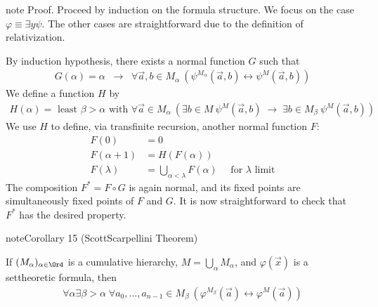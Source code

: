 \documentclass[letterpaper,10pt,english]{jupyterBook}
\begin{document}
\begin{sphinxadmonition}{note}
\sphinxAtStartPar
Proof. Proceed by induction on the formula structure. We focus on the case \(\varphi \equiv \exists y \psi\). The other cases are straightforward due to the definition of relativization.

\sphinxAtStartPar
By induction hypothesis, there exists a normal function \(G\) such that
\begin{equation*}
\begin{split}
G(\alpha) = \alpha \; \; \rightarrow \;\;  \forall \vec{a},b \in M_\alpha \: (\psi^{M_\alpha}(\vec{a},b) \leftrightarrow \psi^{M}(\vec{a},b))
\end{split}
\end{equation*}
\sphinxAtStartPar
We define a function \(H\) by
\begin{equation*}
\begin{split}
H(\alpha) = \text{ least } \beta > \alpha \text{ with } \forall \vec{a} \in M_\alpha \: ( \exists b \in M \: \psi^M(\vec{a},b) \; \rightarrow \; \exists b \in M_\beta \: \psi^M(\vec{a},b))
\end{split}
\end{equation*}
\sphinxAtStartPar
We use \(H\) to define, via transfinite recursion, another normal function \(F\):
\begin{align*}
	F(0) & = 0 \\
	F(\alpha+1) & = H(F(\alpha)) \\
	F(\lambda) & = \bigcup_{\alpha < \lambda} F(\alpha) \quad \text{ for $\lambda$ limit}
\end{align*}
\sphinxAtStartPar
The composition \(F^* = F\circ G\) is again normal, and its fixed points are simultaneously fixed points of \(F\) and \(G\). It is now straightforward to check  that \(F^*\) has the desired property.
\end{sphinxadmonition}
\label{constructible:cor-Scott-Scarpellini}
\begin{sphinxadmonition}{note}{Corollary 15 (Scott\sphinxhyphen{}Scarpellini Theorem)}



\sphinxAtStartPar
If \((M_\alpha)_{\alpha \in \Ord}\) is a cumulative hierarchy, \(M = \bigcup_\alpha M_\alpha\), and \(\varphi(\vec{x})\) is a set\sphinxhyphen{}theoretic formula, then
\begin{equation*}
\begin{split}
\forall \alpha \exists \beta > \alpha \; \forall a_0, \dots, a_{n-1} \in M_\beta \: (\varphi^{M_\beta}(\vec{a}) \leftrightarrow \varphi^{M}(\vec{a}))
\end{split}
\end{equation*}\end{sphinxadmonition}
\end{document}
